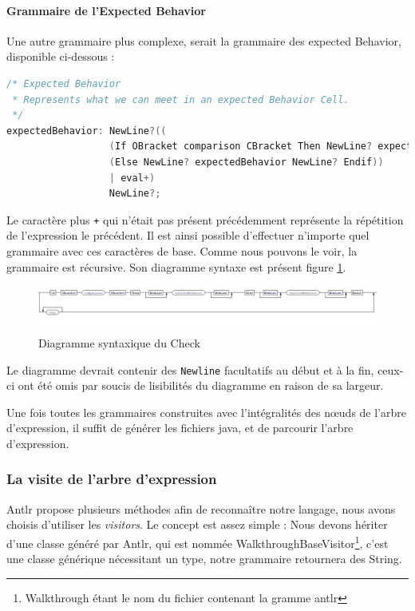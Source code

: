 		\paragraph{Grammaire de l'Expected Behavior}
		Une autre grammaire plus complexe, serait la grammaire des expected Behavior, disponible ci-dessous : 
\begin{lstlisting}[caption=Grammaire Check, numbers=none, language=C]
/* Expected Behavior 
 * Represents what we can meet in an expected Behavior Cell.
 */
expectedBehavior: NewLine?((
                  (If OBracket comparison CBracket Then NewLine? expectedBehavior NewLine?)
                  (Else NewLine? expectedBehavior NewLine? Endif))
                  | eval+)
                  NewLine?;
\end{lstlisting}
Le caractère plus \texttt{+} qui n'était pas présent précédemment représente la répétition de l'expression le précédent. Il est ainsi possible d'effectuer n'importe quel grammaire avec ces caractères de base. Comme nous pouvons le voir, la grammaire est récursive. Son diagramme syntaxe est présent figure \ref{fig:diagSynEB}.
\begin{figure}[H]
	\centering
		\hspace*{-40px}
	\includegraphics[width=20cm]{contents/images/expectedBehaviorGrammar.jpg}
	\caption{Diagramme syntaxique du Check}
	\label{fig:diagSynEB}
\end{figure}
\begin{remarque}
Le diagramme devrait contenir des \texttt{Newline} facultatifs au début et à la fin, ceux-ci ont été omis par soucis de lisibilités du diagramme en raison de sa largeur.
\end{remarque}

Une fois toutes les grammaires construites avec l'intégralités des n\oe{}uds de l'arbre d'expression, il suffit de générer les fichiers java, et de parcourir l'arbre d'expression.

	\subsubsection{La visite de l'arbre d'expression}
	Antlr propose plusieurs méthodes afin de reconnaître notre langage, nous avons choisis d'utiliser les \textit{visitors}. Le concept est assez simple : Nous devons hériter d'une classe généré par Antlr, qui est nommée WalkthroughBaseVisitor\footnote{Walkthrough étant le nom du fichier contenant la gramme antlr}, c'est une classe générique nécessitant un type, notre grammaire retournera des String.

